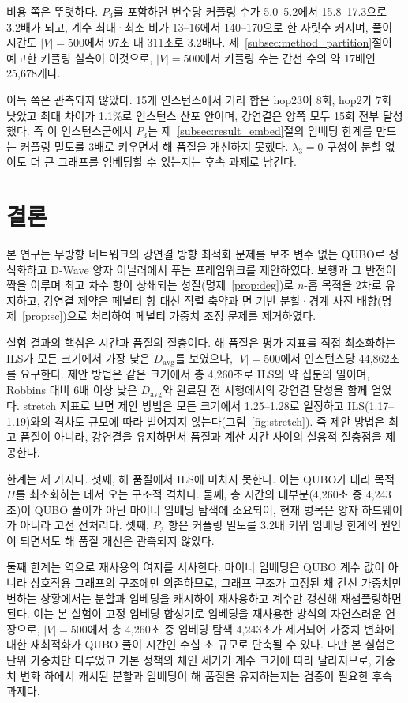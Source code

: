 \documentclass[twocolumn,a4paper]{article}
\begin{document}
비용 쪽은 뚜렷하다. \(P_3\)를 포함하면 변수당 커플링 수가 5.0--5.2에서 15.8--17.3으로 3.2배가 되고, 계수 최대·최소 비가 13--16에서 140--170으로 한 자릿수 커지며, 풀이 시간도 \(|V|=500\)에서 97초 대 311초로 3.2배다. 제~\ref{subsec:method_partition}절이 예고한 커플링 실측이 이것으로, \(|V|=500\)에서 커플링 수는 간선 수의 약 17배인 25{,}678개다.

이득 쪽은 관측되지 않았다. 15개 인스턴스에서 거리 합은 hop23이 8회, hop2가 7회 낮았고 최대 차이가 1.1\%로 인스턴스 산포 안이며, 강연결은 양쪽 모두 15회 전부 달성했다. 즉 이 인스턴스군에서 \(P_3\)는 제~\ref{subsec:result_embed}절의 임베딩 한계를 만드는 커플링 밀도를 3배로 키우면서 해 품질을 개선하지 못했다. \(\lambda_3=0\) 구성이 분할 없이도 더 큰 그래프를 임베딩할 수 있는지는 후속 과제로 남긴다.

\section{결론} \label{sec:conclusion}

본 연구는 무방향 네트워크의 강연결 방향 최적화 문제를 보조 변수 없는 QUBO로 정식화하고 D-Wave 양자 어닐러에서 푸는 프레임워크를 제안하였다. 보행과 그 반전이 짝을 이루며 최고 차수 항이 상쇄되는 성질(명제~\ref{prop:deg})로 \(n\)-홉 목적을 2차로 유지하고, 강연결 제약은 페널티 항 대신 직렬 축약과 면 기반 분할·경계 사전 배향(명제~\ref{prop:sc})으로 처리하여 페널티 가중치 조정 문제를 제거하였다.

실험 결과의 핵심은 시간과 품질의 절충이다. 해 품질은 평가 지표를 직접 최소화하는 ILS가 모든 크기에서 가장 낮은 \(D_{\mathrm{avg}}\)를 보였으나, \(|V|=500\)에서 인스턴스당 44{,}862초를 요구한다. 제안 방법은 같은 크기에서 총 4{,}260초로 ILS의 약 십분의 일이며, Robbins 대비 6배 이상 낮은 \(D_{\mathrm{avg}}\)와 완료된 전 시행에서의 강연결 달성을 함께 얻었다. stretch 지표로 보면 제안 방법은 모든 크기에서 1.25--1.28로 일정하고 ILS(1.17--1.19)와의 격차도 규모에 따라 벌어지지 않는다(그림~\ref{fig:stretch}). 즉 제안 방법은 최고 품질이 아니라, 강연결을 유지하면서 품질과 계산 시간 사이의 실용적 절충점을 제공한다.

한계는 세 가지다. 첫째, 해 품질에서 ILS에 미치지 못한다. 이는 QUBO가 대리 목적 \(H\)를 최소화하는 데서 오는 구조적 격차다. 둘째, 총 시간의 대부분(4{,}260초 중 4{,}243초)이 QUBO 풀이가 아닌 마이너 임베딩 탐색에 소요되어, 현재 병목은 양자 하드웨어가 아니라 고전 전처리다. 셋째, \(P_3\) 항은 커플링 밀도를 3.2배 키워 임베딩 한계의 원인이 되면서도 해 품질 개선은 관측되지 않았다.

둘째 한계는 역으로 재사용의 여지를 시사한다. 마이너 임베딩은 QUBO 계수 값이 아니라 상호작용 그래프의 구조에만 의존하므로, 그래프 구조가 고정된 채 간선 가중치만 변하는 상황에서는 분할과 임베딩을 캐시하여 재사용하고 계수만 갱신해 재샘플링하면 된다. 이는 본 실험이 고정 임베딩 합성기로 임베딩을 재사용한 방식의 자연스러운 연장으로, \(|V|=500\)에서 총 4{,}260초 중 임베딩 탐색 4{,}243초가 제거되어 가중치 변화에 대한 재최적화가 QUBO 풀이 시간인 수십 초 규모로 단축될 수 있다. 다만 본 실험은 단위 가중치만 다루었고 기본 정책의 체인 세기가 계수 크기에 따라 달라지므로, 가중치 변화 하에서 캐시된 분할과 임베딩이 해 품질을 유지하는지는 검증이 필요한 후속 과제다.
\end{document}
